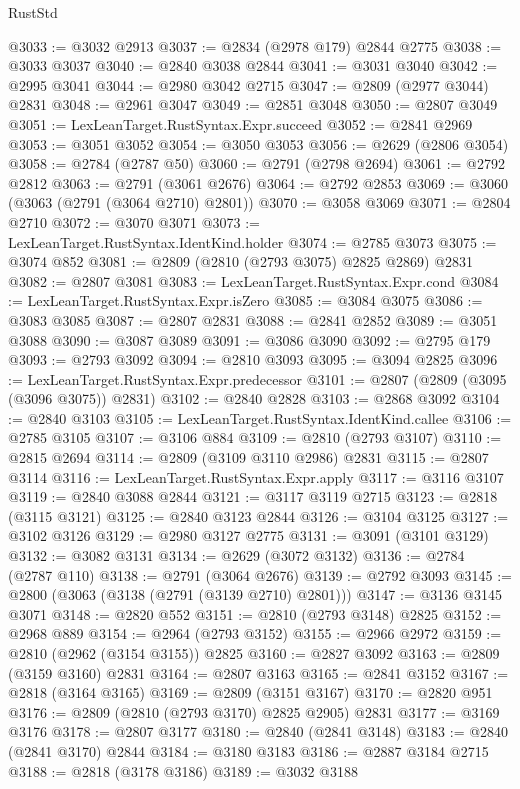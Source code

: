 \begin{lexlean}{RustStd}
\begin{coremodule}
@3033 := @3032 @2913
@3037 := @2834 (@2978 @179) @2844 @2775
@3038 := @3033 @3037
@3040 := @2840 @3038 @2844
@3041 := @3031 @3040
@3042 := @2995 @3041
@3044 := @2980 @3042 @2715
@3047 := @2809 (@2977 @3044) @2831
@3048 := @2961 @3047
@3049 := @2851 @3048
@3050 := @2807 @3049
@3051 := LexLeanTarget.RustSyntax.Expr.succeed
@3052 := @2841 @2969
@3053 := @3051 @3052
@3054 := @3050 @3053
@3056 := @2629 (@2806 @3054)
@3058 := @2784 (@2787 @50)
@3060 := @2791 (@2798 @2694)
@3061 := @2792 @2812
@3063 := @2791 (@3061 @2676)
@3064 := @2792 @2853
@3069 := @3060 (@3063 (@2791 (@3064 @2710) @2801))
@3070 := @3058 @3069
@3071 := @2804 @2710
@3072 := @3070 @3071
@3073 := LexLeanTarget.RustSyntax.IdentKind.holder
@3074 := @2785 @3073
@3075 := @3074 @852
@3081 := @2809 (@2810 (@2793 @3075) @2825 @2869) @2831
@3082 := @2807 @3081
@3083 := LexLeanTarget.RustSyntax.Expr.cond
@3084 := LexLeanTarget.RustSyntax.Expr.isZero
@3085 := @3084 @3075
@3086 := @3083 @3085
@3087 := @2807 @2831
@3088 := @2841 @2852
@3089 := @3051 @3088
@3090 := @3087 @3089
@3091 := @3086 @3090
@3092 := @2795 @179
@3093 := @2793 @3092
@3094 := @2810 @3093
@3095 := @3094 @2825
@3096 := LexLeanTarget.RustSyntax.Expr.predecessor
@3101 := @2807 (@2809 (@3095 (@3096 @3075)) @2831)
@3102 := @2840 @2828
@3103 := @2868 @3092
@3104 := @2840 @3103
@3105 := LexLeanTarget.RustSyntax.IdentKind.callee
@3106 := @2785 @3105
@3107 := @3106 @884
@3109 := @2810 (@2793 @3107)
@3110 := @2815 @2694
@3114 := @2809 (@3109 @3110 @2986) @2831
@3115 := @2807 @3114
@3116 := LexLeanTarget.RustSyntax.Expr.apply
@3117 := @3116 @3107
@3119 := @2840 @3088 @2844
@3121 := @3117 @3119 @2715
@3123 := @2818 (@3115 @3121)
@3125 := @2840 @3123 @2844
@3126 := @3104 @3125
@3127 := @3102 @3126
@3129 := @2980 @3127 @2775
@3131 := @3091 (@3101 @3129)
@3132 := @3082 @3131
@3134 := @2629 (@3072 @3132)
@3136 := @2784 (@2787 @110)
@3138 := @2791 (@3064 @2676)
@3139 := @2792 @3093
@3145 := @2800 (@3063 (@3138 (@2791 (@3139 @2710) @2801)))
@3147 := @3136 @3145 @3071
@3148 := @2820 @552
@3151 := @2810 (@2793 @3148) @2825
@3152 := @2968 @889
@3154 := @2964 (@2793 @3152)
@3155 := @2966 @2972
@3159 := @2810 (@2962 (@3154 @3155)) @2825
@3160 := @2827 @3092
@3163 := @2809 (@3159 @3160) @2831
@3164 := @2807 @3163
@3165 := @2841 @3152
@3167 := @2818 (@3164 @3165)
@3169 := @2809 (@3151 @3167)
@3170 := @2820 @951
@3176 := @2809 (@2810 (@2793 @3170) @2825 @2905) @2831
@3177 := @3169 @3176
@3178 := @2807 @3177
@3180 := @2840 (@2841 @3148)
@3183 := @2840 (@2841 @3170) @2844
@3184 := @3180 @3183
@3186 := @2887 @3184 @2715
@3188 := @2818 (@3178 @3186)
@3189 := @3032 @3188

\end{coremodule}
\end{lexlean}
